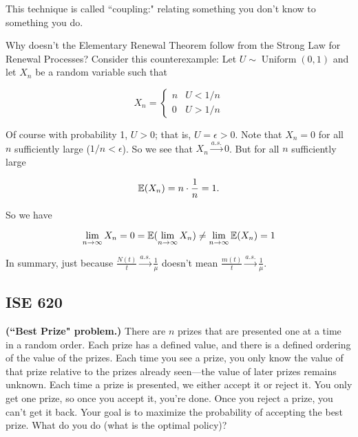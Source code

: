 \begin{remark}This technique is called ``coupling:" relating something you don't know to something you do.

\end{remark}

\begin{remark} Why doesn't the Elementary Renewal Theorem follow from the Strong Law for Renewal Processes? Consider this counterexample: Let \(U \sim \operatorname{Uniform}(0,1)\) and let \(X_n\) be a random variable such that

\[
X_n = \begin{cases}
n & U < 1/n \\
0 & U > 1/n 
\end{cases}
\]

Of course with probability 1, \(U > 0\); that is, \(U = \epsilon > 0\). Note that \(X_n = 0\) for all \(n\) sufficiently large (\(1/n < \epsilon\)). So we see that \(X_n \xrightarrow{a.s.} 0\). But for all \(n\) sufficiently large

\[
\E(X_n) = n \cdot \frac{1}{n} = 1.
\]


So we have

\[
\lim_{n \to \infty} X_n = 0 = \E( \lim_{n \to \infty} X_n) \neq \lim_{n \to \infty} \E(X_n) = 1
\]

In summary, just because \(\frac{N(t)}{t} \xrightarrow{a.s.} \frac{1}{\mu}\) doesn't mean \(\frac{m(t)}{t} \xrightarrow{a.s.} \frac{1}{\mu}.\)
\end{remark}

\subsection{ISE 620}

\begin{exercise} \textbf{(``Best Prize" problem.)} There are \(n\) prizes that are presented one at a time in a random order. Each prize has a defined value, and there is a defined ordering of the value of the prizes. Each time you see a prize, you only know the value of that prize relative to the prizes already seen---the value of later prizes remains unknown. Each time a prize is presented, we either accept it or reject it. You only get one prize, so once you accept it, you're done. Once you reject a prize, you can't get it back. Your goal is to maximize the probability of accepting the best prize. What do you do (what is the optimal policy)?

\end{exercise}

